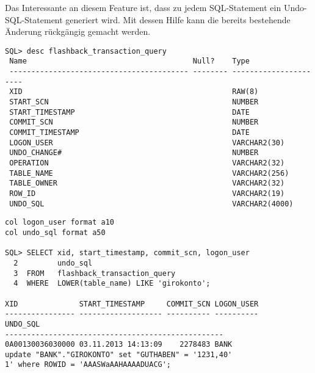           Das Interessante an diesem Feature ist, dass zu jedem SQL-Statement ein Undo-SQL-Statement generiert wird. Mit dessen Hilfe kann die bereits bestehende \"Anderung r\"uckg\"angig gemacht werden.
          \begin{lstlisting}[caption={Die Tabelle \identifier{flashback\_transaction\_query}},label=admin1707,language=oracle_sql,alsolanguage=sqlplus,emph={[9]RAW,NUMBER,DATE,VARCHAR2},emphstyle={[9]\color{black}}]
SQL> desc flashback_transaction_query
 Name                                      Null?    Type
 ----------------------------------------- -------- ----------------------
 XID                                                RAW(8)
 START_SCN                                          NUMBER
 START_TIMESTAMP                                    DATE
 COMMIT_SCN                                         NUMBER
 COMMIT_TIMESTAMP                                   DATE
 LOGON_USER                                         VARCHAR2(30)
 UNDO_CHANGE#                                       NUMBER
 OPERATION                                          VARCHAR2(32)
 TABLE_NAME                                         VARCHAR2(256)
 TABLE_OWNER                                        VARCHAR2(32)
 ROW_ID                                             VARCHAR2(19)
 UNDO_SQL                                           VARCHAR2(4000)
          \end{lstlisting}
\clearpage
          \begin{lstlisting}[caption={Informationsgewinnung mit Flashback Transaction Query},label=admin1708,language=oracle_sql,alsolanguage=sqlplus]
col logon_user format a10
col undo_sql format a50

SQL> SELECT xid, start_timestamp, commit_scn, logon_user
  2         undo_sql
  3  FROM   flashback_transaction_query
  4  WHERE  LOWER(table_name) LIKE 'girokonto';

XID              START_TIMESTAMP     COMMIT_SCN LOGON_USER
---------------- ------------------- ---------- ----------
UNDO_SQL
--------------------------------------------------
0A00130036030000 03.11.2013 14:13:09    2278483 BANK
update "BANK"."GIROKONTO" set "GUTHABEN" = '1231,40'
1' where ROWID = 'AAASWaAAHAAAADUACG';

          \end{lstlisting}

          \begin{literaturinternet}
            \item \cite{ADFNS01005}
          \end{literaturinternet}
